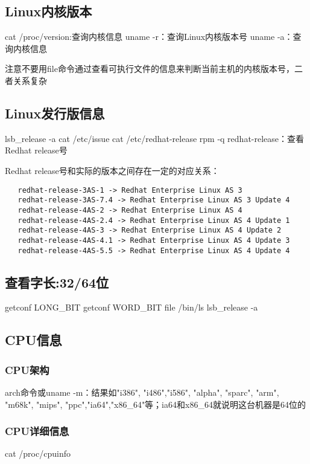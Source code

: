 \subsection*{Linux内核版本}
\begin{shellcmd}
cat /proc/version:查询内核信息
uname -r：查询Linux内核版本号
uname -a：查询内核信息
\end{shellcmd}
注意不要用file命令通过查看可执行文件的信息来判断当前主机的内核版本号，二者关系复杂
\subsection*{Linux发行版信息}
\begin{shellcmd}
lsb_release -a 
cat /etc/issue
cat /etc/redhat-release
rpm -q redhat-release：查看Redhat release号
\end{shellcmd}
Redhat release号和实际的版本之间存在一定的对应关系：
\begin{verbatim}
   redhat-release-3AS-1 -> Redhat Enterprise Linux AS 3
   redhat-release-3AS-7.4 -> Redhat Enterprise Linux AS 3 Update 4
   redhat-release-4AS-2 -> Redhat Enterprise Linux AS 4
   redhat-release-4AS-2.4 -> Redhat Enterprise Linux AS 4 Update 1
   redhat-release-4AS-3 -> Redhat Enterprise Linux AS 4 Update 2
   redhat-release-4AS-4.1 -> Redhat Enterprise Linux AS 4 Update 3
   redhat-release-4AS-5.5 -> Redhat Enterprise Linux AS 4 Update 4 
\end{verbatim} 

\subsection*{查看字长:32/64位}
\begin{shellcmd}
getconf LONG_BIT
getconf WORD_BIT
file /bin/ls
lsb_release -a
\end{shellcmd}
\subsection*{CPU信息}
\subsubsection*{CPU架构}
arch命令或uname -m：结果如"i386", "i486","i586", "alpha", "sparc", "arm", "m68k", 
"mips", "ppc","ia64","x86\_64"等；ia64和x86\_64就说明这台机器是64位的
\subsubsection*{CPU详细信息}
\begin{shellcmd}
cat /proc/cpuinfo
\end{shellcmd}
